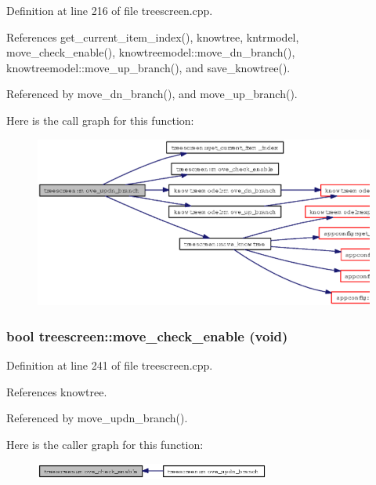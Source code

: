 Definition at line 216 of file treescreen.cpp.

References get\_\-current\_\-item\_\-index(), knowtree, kntrmodel, move\_\-check\_\-enable(), knowtreemodel::move\_\-dn\_\-branch(), knowtreemodel::move\_\-up\_\-branch(), and save\_\-knowtree().

Referenced by move\_\-dn\_\-branch(), and move\_\-up\_\-branch().

Here is the call graph for this function:\begin{figure}[H]
\begin{center}
\leavevmode
\includegraphics[width=372pt]{classtreescreen_773a34b2a15964d0101b142b54da3986_cgraph}
\end{center}
\end{figure}
\subsubsection{\setlength{\rightskip}{0pt plus 5cm}bool treescreen::move\_\-check\_\-enable (void)\hspace{0.3cm}{\tt  [private]}}\label{classtreescreen_66dff8576eca276e70d0d778a283eff7}




Definition at line 241 of file treescreen.cpp.

References knowtree.

Referenced by move\_\-updn\_\-branch().

Here is the caller graph for this function:\begin{figure}[H]
\begin{center}
\leavevmode
\includegraphics[width=219pt]{classtreescreen_66dff8576eca276e70d0d778a283eff7_icgraph}
\end{center}
\end{figure}
